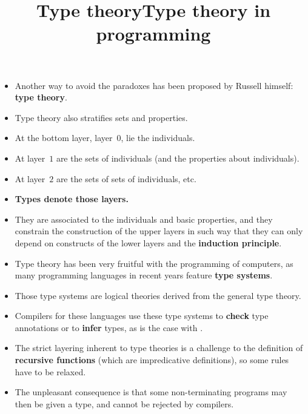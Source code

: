 \documentclass[wide]{slides}
\begin{document}
\begin{slide}
  \title{Type theory}

  \begin{itemize}

    \item Another way to avoid the paradoxes has been proposed by
      Russell himself: \textbf{type theory}.

    \item Type theory also stratifies sets and properties.

    \item At the bottom layer, layer~$0$, lie the individuals.

    \item At layer~$1$ are the sets of individuals (and the properties
      about individuals).

    \item At layer~$2$ are the sets of sets of individuals, etc.

    \item \textbf{Types denote those layers.}

    \item They are associated to the individuals and basic properties,
      and they constrain the construction of the upper layers in such
      way that they can only depend on constructs of the lower layers
      and the \textbf{induction principle}.

  \end{itemize}
\end{slide}

\begin{slide}
  \title{Type theory in programming}

  \begin{itemize}

    \item Type theory has been very fruitful with the programming of
      computers, as many programming languages in recent years feature
      \textbf{type systems}.

    \item Those type systems are logical theories derived from the
      general type theory.

    \item Compilers for these languages use these type systems to
      \textbf{check} type annotations or to \textbf{infer} types, as
      is the case with \OCaml.

    \item The strict layering inherent to type theories is a challenge
      to the definition of \textbf{recursive functions} (which are
      impredicative definitions), so some rules have to be relaxed.

    \item The unpleasant consequence is that some non\hyp{}terminating
      programs may then be given a type, and cannot be rejected by
      compilers.

  \end{itemize}

\end{slide}
\end{document}
